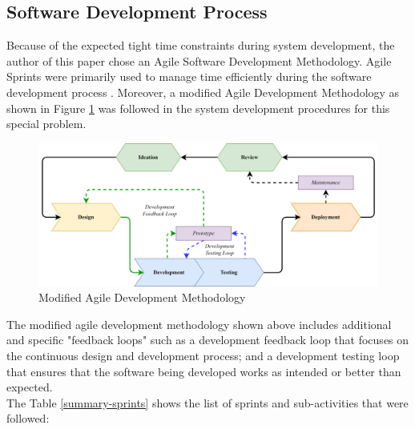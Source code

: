 \subsection{Software Development Process}
\label{subsec:soft_dev}
Because of the expected tight time constraints during system 
development, the author of this paper chose an Agile Software 
Development Methodology. Agile Sprints were primarily used to manage 
time efficiently during the software development process
\cite{JavaTPointAgile, Milne2021}. Moreover, a modified Agile Development Methodology as
shown in Figure \ref{fig:agile} was followed in the system
development procedures for this special problem.

\begin{figure}[ht]
    \centering
    \includegraphics[width=1\textwidth]{./assets/Chapter_3/agile.png}
    \caption{Modified Agile Development Methodology}
    \label{fig:agile}
\end{figure}
\FloatBarrier

The modified agile development methodology shown above includes 
additional and specific "feedback loops" such as a development 
feedback loop that focuses on the continuous design and development 
process; and a development testing loop that ensures that the 
software being developed works as intended or better than expected.
\hfill \\

The Table \ref{summary-sprints} shows the list of sprints and 
sub-activities that were followed:
\hfill \\

